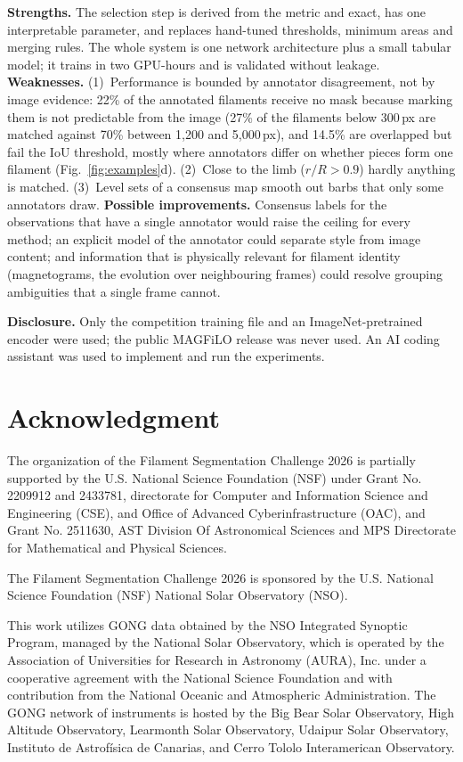 \documentclass[sigconf]{acmart}
\begin{document}
    \textbf{Strengths.} The selection step is derived from the metric and exact, has one interpretable parameter, and replaces hand-tuned thresholds, minimum areas and merging rules. The whole system is one network architecture plus a small tabular model; it trains in two GPU-hours and is validated without leakage.
    \textbf{Weaknesses.} (1)~Performance is bounded by annotator disagreement, not by image evidence: 22\% of the annotated filaments receive no mask because marking them is not predictable from the image (27\% of the filaments below 300\,px are matched against 70\% between 1{,}200 and 5{,}000\,px), and 14.5\% are overlapped but fail the IoU threshold, mostly where annotators differ on whether pieces form one filament (Fig.~\ref{fig:examples}d). (2)~Close to the limb ($r/R>0.9$) hardly anything is matched. (3)~Level sets of a consensus map smooth out barbs that only some annotators draw.
    \textbf{Possible improvements.} Consensus labels for the observations that have a single annotator would raise the ceiling for every method; an explicit model of the annotator could separate style from image content; and information that is physically relevant for filament identity (magnetograms, the evolution over neighbouring frames) could resolve grouping ambiguities that a single frame cannot.

    \textbf{Disclosure.} Only the competition training file and an ImageNet-pretrained encoder were used; the public MAGFiLO release was never used. An AI coding assistant was used to implement and run the experiments.

\section{Acknowledgment}\label{sec:acknowledgment}
    The organization of the Filament Segmentation Challenge 2026 is partially supported by the U.S. National Science Foundation (NSF) under Grant No. 2209912 and 2433781, directorate for Computer and Information Science and Engineering (CSE), and Office of Advanced Cyberinfrastructure (OAC), and Grant No. 2511630, AST Division Of Astronomical Sciences and MPS Directorate for Mathematical and Physical Sciences.

    The Filament Segmentation Challenge 2026 is sponsored by the U.S. National Science Foundation (NSF) National Solar Observatory (NSO).

    This work utilizes GONG data obtained by the NSO Integrated Synoptic Program, managed by the National Solar Observatory, which is operated by the Association of Universities for Research in Astronomy (AURA), Inc. under a cooperative agreement with the National Science Foundation and with contribution from the National Oceanic and Atmospheric Administration. The GONG network of instruments is hosted by the Big Bear Solar Observatory, High Altitude Observatory, Learmonth Solar Observatory, Udaipur Solar Observatory, Instituto de Astrofísica de Canarias, and Cerro Tololo Interamerican Observatory.



\end{document}
